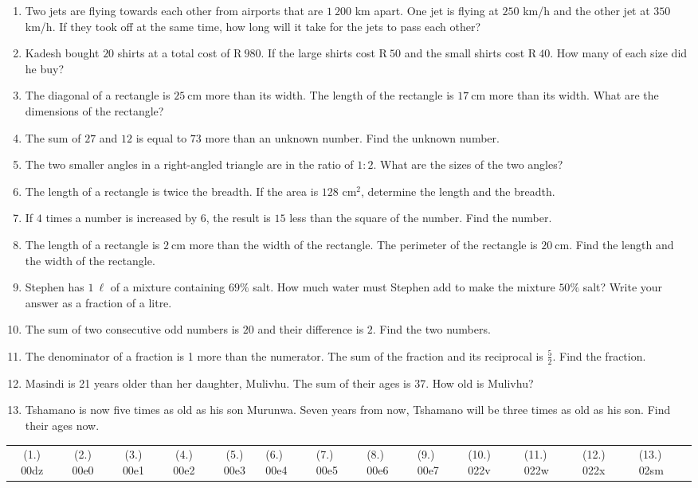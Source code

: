 \begin{exercises}{}
{
\begin{enumerate}[noitemsep, label=\textbf{\arabic*}. ] 
\item Two jets are flying towards each other from airports that are $1~200$ km apart. One jet is flying at $250$ km/h and the other jet at $350$ km/h. If they took off at the same time, how long will it take for the jets to pass each other?
\item Kadesh bought $20$ shirts at a total cost of R$~980$. If the
  large shirts cost R$~50$ and the small shirts cost R$~40$. How many
  of each size did he buy?
\item The diagonal of a rectangle is $25~$cm more than its width. The length of the rectangle is $17~$cm more than its width. What are the dimensions of the rectangle?  
\item The sum of $27$ and $12$ is equal to $73$ more than an unknown number. Find the unknown number.
\item The two smaller angles in a right-angled triangle are in the ratio of $1:2$. What are the sizes of the two angles? 
\item The length of a rectangle is twice the breadth. If the area is $128$ cm$^{2}$, determine the length and the breadth.       
\item If $4$ times a number is increased by $6$, the result is $15$ less than the square of the number. Find the number.
\item The length of a rectangle is $2~$cm more than the width of the rectangle. The perimeter of the rectangle is $20~$cm. Find the length and the width of the rectangle.
\item Stephen has $1~\ell{}$ of a mixture containing $69\%$ salt. How much water must Stephen add to make the mixture $50\%$ salt? Write your answer as a fraction of a litre.
\item The sum of two consecutive odd numbers is $20$ and their difference is $2$. Find the two numbers. 
\item The denominator of a fraction is 1 more than the numerator. The sum of the fraction and its reciprocal is $\frac{5}{2}$. Find the fraction.
\item Masindi is 21 years older than her daughter, Mulivhu. The sum of their ages is 37. How old is Mulivhu? 
\item Tshamano is now five times as old as his son Murunwa. Seven years from now, Tshamano will be three times as old as his son. Find their ages now.    
\end{enumerate}
\practiceinfo
\par 
\par \begin{tabular}[h]{ccccc}
(1.) 00dz&  (2.) 00e0&  (3.) 00e1&  (4.) 00e2&  (5.) 00e3&  (6.) 00e4&  (7.) 00e5& (8.) 00e6& (9.) 00e7 & (10.) 022v & (11.) 022w & (12.) 022x & (13.) 02sm \end{tabular}
}
\end{exercises}

